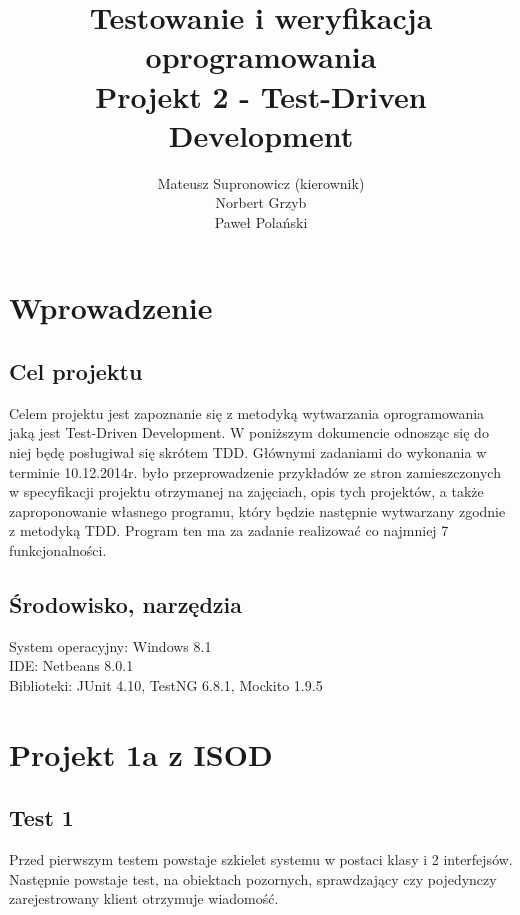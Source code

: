 \documentclass[a4paper,12pt,twoside]{article}
\title{Testowanie i weryfikacja oprogramowania \\ Projekt 2 - Test-Driven Development}
\author{Mateusz Supronowicz (kierownik) \\ Norbert Grzyb \\ Paweł Polański}
\begin{document}
\maketitle


\section{Wprowadzenie}
\bigskip


\subsection{Cel projektu}

Celem projektu jest zapoznanie się z metodyką wytwarzania oprogramowania jaką jest Test-Driven Development.
W poniższym dokumencie odnosząc się do niej będę posługiwał się skrótem TDD. Głównymi zadaniami do
wykonania w terminie 10.12.2014r. było przeprowadzenie przykładów ze stron zamieszczonych w specyfikacji
projektu otrzymanej na zajęciach, opis tych projektów, a także zaproponowanie własnego programu, który
będzie następnie wytwarzany zgodnie z metodyką TDD. Program ten ma za zadanie realizować co najmniej
7 funkcjonalności.

\subsection{Środowisko, narzędzia}

System operacyjny: Windows 8.1\\
IDE: Netbeans 8.0.1\\
Biblioteki: JUnit 4.10, TestNG 6.8.1, Mockito 1.9.5


\section{Projekt 1a z ISOD}
\bigskip


\subsection{Test 1}

Przed pierwszym testem powstaje szkielet systemu w postaci klasy i 2 interfejsów.
Następnie powstaje test, na obiektach pozornych, sprawdzający czy pojedynczy zarejestrowany klient otrzymuje wiadomość.
\end{document}
